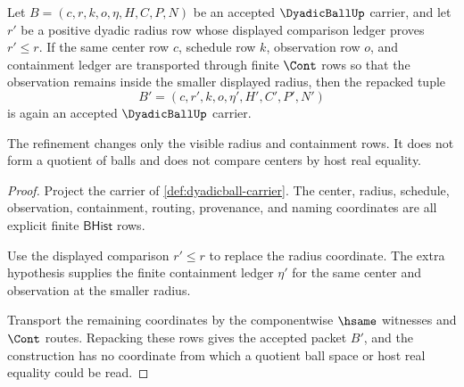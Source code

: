 \begin{theorem}
\label{thm:dyadicball-radius-refinement-closure}
Let $B=(c,r,k,o,\eta,H,C,P,N)$ be an accepted $\DyadicBallUp$ carrier, and let
$r'$ be a positive dyadic radius row whose displayed comparison ledger proves
$r'\leq r$. If the same center row $c$, schedule row $k$, observation row $o$,
and containment ledger are transported through finite $\Cont$ rows so that the
observation remains inside the smaller displayed radius, then the repacked
tuple
$$
B'=(c,r',k,o,\eta',H',C',P',N')
$$
is again an accepted $\DyadicBallUp$ carrier.

The refinement changes only the visible radius and containment rows. It does
not form a quotient of balls and does not compare centers by host real
equality.
\end{theorem}
\begin{proof}
Project the carrier of \autoref{def:dyadicball-carrier}. The center, radius,
schedule, observation, containment, routing, provenance, and naming
coordinates are all explicit finite $\mathsf{BHist}$ rows.

Use the displayed comparison $r'\leq r$ to replace the radius coordinate. The
extra hypothesis supplies the finite containment ledger $\eta'$ for the same
center and observation at the smaller radius.

Transport the remaining coordinates by the componentwise $\hsame$ witnesses
and $\Cont$ routes. Repacking these rows gives the accepted packet $B'$, and
the construction has no coordinate from which a quotient ball space or host
real equality could be read.
\end{proof}

